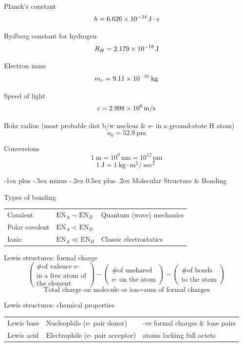 \documentclass[10pt,landscape]{article}
\makeatletter
\renewcommand{\section}{\@startsection{section}{1}{0mm}%
                                {-1ex plus -.5ex minus -.2ex}%
                                {0.5ex plus .2ex}%
                                {\normalfont\large\bfseries}}
\newcommand{\extraline}{\vspace{1em}}
\newcommand{\tableindent}{\hspace{1.5em}}
\makeatother
\begin{document}
\begin{multicols}{3}
Planck's constant
\[ h = \SI{6.626E-34}{\joule\cdot\second} \]
 
 Rydberg constant for hydrogen
 \[ R_H =  \SI{2.179E-18}{\joule} \]
 
Electron mass
\[  m_e = \SI{9,11E-31}{\kilogram} \]

Speed of light
\[ c = \SI{2.998E8}{\meter/\second}  \]

Bohr radius {(most probable dist b/w nucleus \& e- in a ground-state H atom)}
\[ a_0 = \SI{52.9}{\pico\metre} \]

Conversions
\[ \SI{1}{\metre} = 10^9 \, \si{\nano\metre} = 10^{12} \, \si{\pico\metre}\]
\[ \SI{1}{\joule} = \SI{1}{\kilogram\cdot\metre^2/\sec^2}  \]


\hrulefill

\section{Molecular Structure \& Bonding}

Types of bonding 

\begin{tabular}{@{\tableindent}llp{26mm}<{\raggedright}@{}}
	Covalent & $\text{EN}_A \sim  \text{EN}_B$ & Quantum (wave) mechanics \\
	Polar covalent & $\text{EN}_A < \text{EN}_B$ & \\
	Ionic & $\text{EN}_A \ll  \text{EN}_B$ &  Classic electrostatics \\
\end{tabular}

Lewis structures: formal charge
\[
\begin{pmatrix}
	 \text{\# of valence e-} \\
	 \text{in a free atom of} \\
	  \text{the element}
\end{pmatrix}
-
\begin{pmatrix}
	\text{\# of unshared} \\
	\text{e- on the atom} 
\end{pmatrix}
-
\begin{pmatrix}
	\text{\# of bonds} \\
	\text{to the atom} 
\end{pmatrix}
\]
\[ \text{Total charge on molecule or ion} = \text{sum of formal charges} \]

\extraline

Lewis structures: chemical properties

\begin{tabular}{@{\tableindent}lp{2.45cm}<{\raggedright}p{2.6cm}<{\raggedright}@{}}
Lewis base & Nucleophile (e- pair donor) & -ve formal charges \& lone pairs \\
Lewis acid & Electrophile (e- pair acceptor) & atoms lacking full octets
\end{tabular}
\extraline


\end{multicols}
\end{document}
